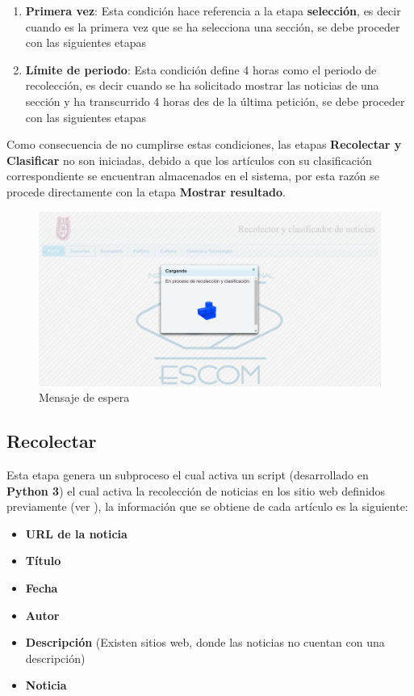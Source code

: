 \begin{enumerate}
	\item \textbf{Primera vez}: Esta condición hace referencia a la etapa \textbf{selección}, es decir cuando es la primera vez que se ha selecciona una sección, se debe proceder con las siguientes etapas

	\item \textbf{Límite de periodo}: Esta condición define 4 horas como el periodo de recolección, es decir cuando se ha solicitado mostrar las noticias de una sección y ha transcurrido 4 horas des de la última petición, se debe proceder con las siguientes etapas
\end{enumerate}	

Como consecuencia de no cumplirse estas condiciones, las etapas \textbf{Recolectar y Clasificar} no son iniciadas, debido a que los artículos con su clasificación correspondiente se encuentran almacenados en el sistema, por esta razón se procede directamente con la etapa \textbf{Mostrar resultado}.

\begin{figure}[H]
\centering
\includegraphics[scale=0.29]{imagenes/Capitulo5/mensajeEspera.png}
\caption{Mensaje de espera}
\label{fig:loading}
\end{figure}


\subsection{Recolectar}


Esta etapa genera un subproceso el cual activa un script (desarrollado en \textbf{Python 3}) el cual activa la recolección de noticias en los sitio web definidos previamente (ver ), la información que se obtiene de cada artículo es la siguiente:

\begin{itemize}
	\item \textbf{URL de la noticia}
	\item \textbf{Título}
	\item \textbf{Fecha}
	\item \textbf{Autor}
	\item \textbf{Descripción} (Existen sitios web, donde las noticias no cuentan con una descripción)
	\item \textbf{Noticia}
\end{itemize}


